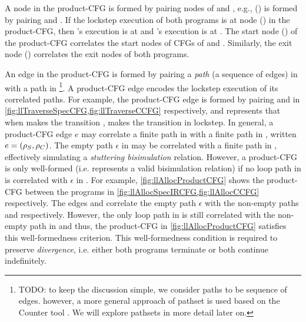 A node in the product-CFG is formed by pairing nodes of \sprog{} and \cprog{},
e.g., () is formed by pairing  and .
If the lockstep execution of both programs is at node () in the product-CFG,
then \sprog{}'s execution is at  and \cprog{}'s execution is at .
The start node () of the product-CFG correlates the start nodes of CFGs of \sprog{} and \cprog{}.
Similarly, the exit node () correlates the exit nodes of both programs.

An edge in the product-CFG is formed by pairing a {\em path} (a sequence of edges) in \sprog{}
with a path in \cprog{}\footnote{TODO: to keep the discussion simple, we consider paths to be sequence of edges. however, a more general approach of pathset
is used based on the Counter tool \cite{oopsla20}. We will explore pathsets in more detail later on.}.
A product-CFG edge encodes the lockstep execution of its correlated paths.
For example, the product-CFG edge  is formed by pairing
 and  in \cref{fig:llTraverseSpecCFG,fig:llTraverseCCFG} respectively,
and represents that when \sprog{} makes the transition , \cprog{} makes the transition 
in lockstep.
In general, a product-CFG edge $e$ may correlate a finite path \sv{\rho} in \sprog{} with a finite path
\cv{\rho} in \cprog{}, written $e=({\tt \rho}_{S},{\tt \rho}_{C})$.
The empty path $\epsilon$ in \sprog{} may be correlated with a finite path in \cprog{},
effectively simulating a {\em stuttering bisimulation} relation.
However, a product-CFG is only well-formed (i.e. represents a valid bisimulation relation)
if no loop path in \cprog{} is correlated with $\epsilon$ in \sprog{}.
For example, \cref{fig:llAllocProductCFG} shows the product-CFG between the programs
in \cref{fig:llAllocSpecIRCFG,fig:llAllocCCFG} respectively.
The edges  and  correlate the empty path $\epsilon$
with the non-empty paths  and  respectively.
However, the only loop path  in \cprog{} is still correlated with the non-empty path 
in \sprog{} and thus, the product-CFG in \cref{fig:llAllocProductCFG} satisfies this well-formedness criterion.
This well-formedness condition is required to preserve {\em divergence}, i.e. either both programs terminate or
both continue indefinitely.

